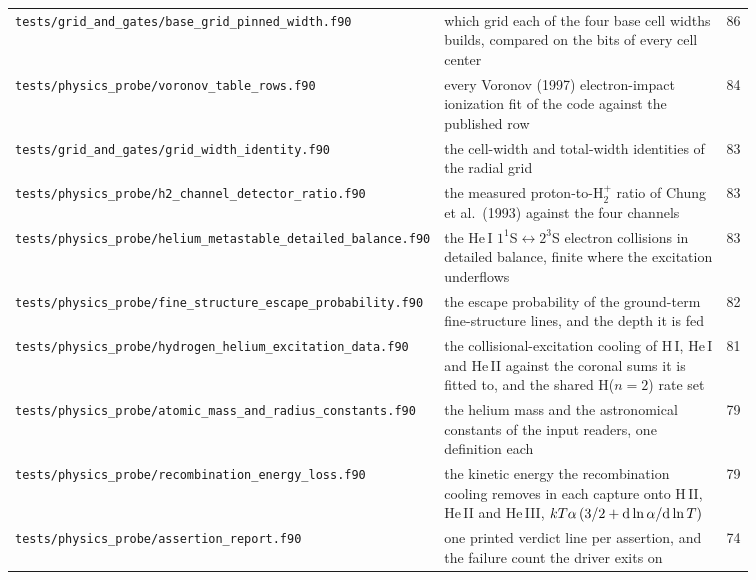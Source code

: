{\begin{longtable}{@{}>{\raggedright\arraybackslash}p{0.36\linewidth} >{\raggedright\arraybackslash}p{0.50\linewidth} r@{}}
\texttt{tests/\allowbreak grid\_\allowbreak and\_\allowbreak gates/\allowbreak base\_\allowbreak grid\_\allowbreak pinned\_\allowbreak width.f90} & which grid each of the four base cell widths builds, compared on the bits of every cell center & 86 \\
\texttt{tests/\allowbreak physics\_\allowbreak probe/\allowbreak voronov\_\allowbreak table\_\allowbreak rows.f90} & every Voronov (1997) electron-impact ionization fit of the code against the published row & 84 \\
\texttt{tests/\allowbreak grid\_\allowbreak and\_\allowbreak gates/\allowbreak grid\_\allowbreak width\_\allowbreak identity.f90} & the cell-width and total-width identities of the radial grid & 83 \\
\texttt{tests/\allowbreak physics\_\allowbreak probe/\allowbreak h2\_\allowbreak channel\_\allowbreak detector\_\allowbreak ratio.f90} & the measured proton-to-H$_2^+$ ratio of Chung et al.\ (1993) against the four channels & 83 \\
\texttt{tests/\allowbreak physics\_\allowbreak probe/\allowbreak helium\_\allowbreak metastable\_\allowbreak detailed\_\allowbreak balance.f90} & the He\,I $1^1$S$\leftrightarrow 2^3$S electron collisions in detailed balance, finite where the excitation underflows & 83 \\
\texttt{tests/\allowbreak physics\_\allowbreak probe/\allowbreak fine\_\allowbreak structure\_\allowbreak escape\_\allowbreak probability.f90} & the escape probability of the ground-term fine-structure lines, and the depth it is fed & 82 \\
\texttt{tests/\allowbreak physics\_\allowbreak probe/\allowbreak hydrogen\_\allowbreak helium\_\allowbreak excitation\_\allowbreak data.f90} & the collisional-excitation cooling of H\,I, He\,I and He\,II against the coronal sums it is fitted to, and the shared H($n{=}2$) rate set & 81 \\
\texttt{tests/\allowbreak physics\_\allowbreak probe/\allowbreak atomic\_\allowbreak mass\_\allowbreak and\_\allowbreak radius\_\allowbreak constants.f90} & the helium mass and the astronomical constants of the input readers, one definition each & 79 \\
\texttt{tests/\allowbreak physics\_\allowbreak probe/\allowbreak recombination\_\allowbreak energy\_\allowbreak loss.f90} & the kinetic energy the recombination cooling removes in each capture onto H\,II, He\,II and He\,III, $kT\alpha\,(3/2 + {\rm d}\ln\alpha/{\rm d}\ln T)$ & 79 \\
\texttt{tests/\allowbreak physics\_\allowbreak probe/\allowbreak assertion\_\allowbreak report.f90} & one printed verdict line per assertion, and the failure count the driver exits on & 74 \\

\end{longtable}}
